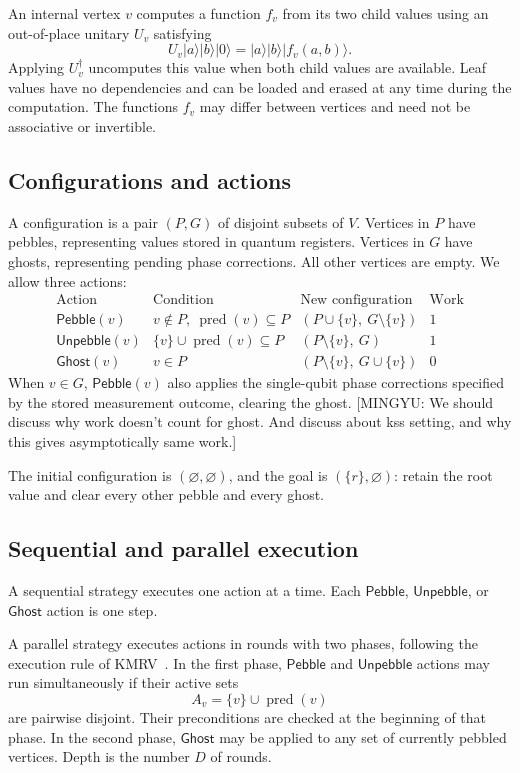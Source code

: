 \documentclass[11pt]{article}
\theoremstyle{definition}
\theoremstyle{remark}
\DeclareMathOperator{\pred}{pred}
\newcommand{\Peb}{\mathsf{Pebble}}
\newcommand{\ket}[1]{\lvert#1\rangle}
\newcommand{\Unp}{\mathsf{Unpebble}}
\newcommand{\Ghost}{\mathsf{Ghost}}
\newcommand{\mingyu}[1]{{\color{magenta}\footnotesize [MINGYU: #1]}} %
\begin{document}
An internal vertex $v$ computes a function $f_v$ from its two child values using an out-of-place unitary $U_v$ satisfying
\[
U_v\ket{a}\ket{b}\ket{0}=\ket{a}\ket{b}\ket{f_v(a,b)}.
\]
Applying $U_v^\dagger$ uncomputes this value when both child values are available. Leaf values have no dependencies and can be loaded and erased at any time during the computation. The functions $f_v$ may differ between vertices and need not be associative or invertible.

\subsection{Configurations and actions}

A configuration is a pair $(P,G)$ of disjoint subsets of $V$. Vertices in $P$ have pebbles, representing values stored in quantum registers. Vertices in $G$ have ghosts, representing pending phase corrections. All other vertices are empty. We allow three actions:
\[
\begin{array}{lllc}
\text{Action} & \text{Condition} & \text{New configuration} & \text{Work} \\[3pt]
\Peb(v) & v\notin P,\ \pred(v)\subseteq P & (P\cup\{v\},\ G\setminus\{v\}) & 1 \\[3pt]
\Unp(v) & \{v\}\cup\pred(v)\subseteq P & (P\setminus\{v\},\ G) & 1 \\[3pt]
\Ghost(v) & v\in P & (P\setminus\{v\},\ G\cup\{v\}) & 0
\end{array}
\]
When $v\in G$, $\Peb(v)$ also applies the single-qubit phase corrections specified by the stored measurement outcome, clearing the ghost. \mingyu{We should discuss why work doesn't count for ghost. And discuss about kss setting, and why this gives asymptotically same work.}

The initial configuration is $(\varnothing,\varnothing)$, and the goal is $(\{r\},\varnothing)$: retain the root value and clear every other pebble and every ghost.

\subsection{Sequential and parallel execution}

A sequential strategy executes one action at a time. Each $\Peb$, $\Unp$, or $\Ghost$ action is one step.

A parallel strategy executes actions in rounds with two phases, following the execution rule of KMRV~\cite[Section~2.1]{KMRV2026}. In the first phase, $\Peb$ and $\Unp$ actions may run simultaneously if their active sets
\begin{equation}
A_v=\{v\}\cup\pred(v)
\label{eq:active-set}
\end{equation}
are pairwise disjoint. Their preconditions are checked at the beginning of that phase. In the second phase, $\Ghost$ may be applied to any set of currently pebbled vertices. Depth is the number $D$ of rounds.
\end{document}
